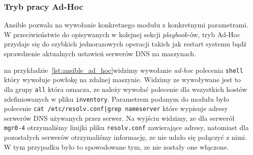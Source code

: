 \subsubsection{Tryb pracy Ad-Hoc}
Ansible pozwala na wywołanie konkretnego modułu z konkretnymi parametrami. W przeciwieństwie do opisywanych w kolejnej sekcji \textit{playbook}-ów, tryb Ad-Hoc przydaje się do szybkich jednorazowych operacji takich jak restart systemu bądź sprawdzenie aktualnych ustawień serwerów DNS na maszynach.

na przykładzie~\ref{lst:ansible_ad_hoc}widzimy wywołanie \textit{ad-hoc} polecenia \texttt{shell} który wywołuje powłokę na zdalnej maszynie.
Widzimy ze wywoływane jest to dla grupy \texttt{all} która oznacza, ze należy wywołać polecenie dla wszystkich hostów zdefiniowanych w pliku \texttt{inventory}.
Parametrem podanym do modułu było polecenie \texttt{cat /etc/resolv.conf|grep nameserver} które wypisuje adresy serwerów DNS używanych przez serwer.
Na wyjściu widzimy, ze dla serwerół \texttt{mgr0-4} otrzymaliśmy linijki pliku \texttt{resolv.conf} zawierające adresy, natomiast dla pozostałych serwerów otrzymaliśmy informację, ze nie udało się połączyć z nimi.
W tym przypadku było to spowodowane tym, ze nie zostały one włączone.

